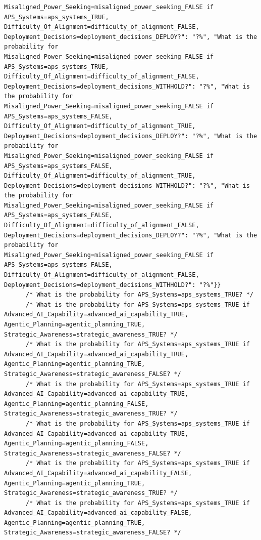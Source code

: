 \documentclass[
  11pt,
  letterpaper,
]{book}
\begin{document}
\begin{landscape}
\begin{verbatim}
Misaligned_Power_Seeking=misaligned_power_seeking_FALSE if APS_Systems=aps_systems_TRUE, Difficulty_Of_Alignment=difficulty_of_alignment_FALSE, Deployment_Decisions=deployment_decisions_DEPLOY?": "?%", "What is the probability for Misaligned_Power_Seeking=misaligned_power_seeking_FALSE if APS_Systems=aps_systems_TRUE, Difficulty_Of_Alignment=difficulty_of_alignment_FALSE, Deployment_Decisions=deployment_decisions_WITHHOLD?": "?%", "What is the probability for Misaligned_Power_Seeking=misaligned_power_seeking_FALSE if APS_Systems=aps_systems_FALSE, Difficulty_Of_Alignment=difficulty_of_alignment_TRUE, Deployment_Decisions=deployment_decisions_DEPLOY?": "?%", "What is the probability for Misaligned_Power_Seeking=misaligned_power_seeking_FALSE if APS_Systems=aps_systems_FALSE, Difficulty_Of_Alignment=difficulty_of_alignment_TRUE, Deployment_Decisions=deployment_decisions_WITHHOLD?": "?%", "What is the probability for Misaligned_Power_Seeking=misaligned_power_seeking_FALSE if APS_Systems=aps_systems_FALSE, Difficulty_Of_Alignment=difficulty_of_alignment_FALSE, Deployment_Decisions=deployment_decisions_DEPLOY?": "?%", "What is the probability for Misaligned_Power_Seeking=misaligned_power_seeking_FALSE if APS_Systems=aps_systems_FALSE, Difficulty_Of_Alignment=difficulty_of_alignment_FALSE, Deployment_Decisions=deployment_decisions_WITHHOLD?": "?%"}}
      /* What is the probability for APS_Systems=aps_systems_TRUE? */
      /* What is the probability for APS_Systems=aps_systems_TRUE if Advanced_AI_Capability=advanced_ai_capability_TRUE, Agentic_Planning=agentic_planning_TRUE, Strategic_Awareness=strategic_awareness_TRUE? */
      /* What is the probability for APS_Systems=aps_systems_TRUE if Advanced_AI_Capability=advanced_ai_capability_TRUE, Agentic_Planning=agentic_planning_TRUE, Strategic_Awareness=strategic_awareness_FALSE? */
      /* What is the probability for APS_Systems=aps_systems_TRUE if Advanced_AI_Capability=advanced_ai_capability_TRUE, Agentic_Planning=agentic_planning_FALSE, Strategic_Awareness=strategic_awareness_TRUE? */
      /* What is the probability for APS_Systems=aps_systems_TRUE if Advanced_AI_Capability=advanced_ai_capability_TRUE, Agentic_Planning=agentic_planning_FALSE, Strategic_Awareness=strategic_awareness_FALSE? */
      /* What is the probability for APS_Systems=aps_systems_TRUE if Advanced_AI_Capability=advanced_ai_capability_FALSE, Agentic_Planning=agentic_planning_TRUE, Strategic_Awareness=strategic_awareness_TRUE? */
      /* What is the probability for APS_Systems=aps_systems_TRUE if Advanced_AI_Capability=advanced_ai_capability_FALSE, Agentic_Planning=agentic_planning_TRUE, Strategic_Awareness=strategic_awareness_FALSE? */

\end{verbatim}
\end{landscape}
\end{document}
